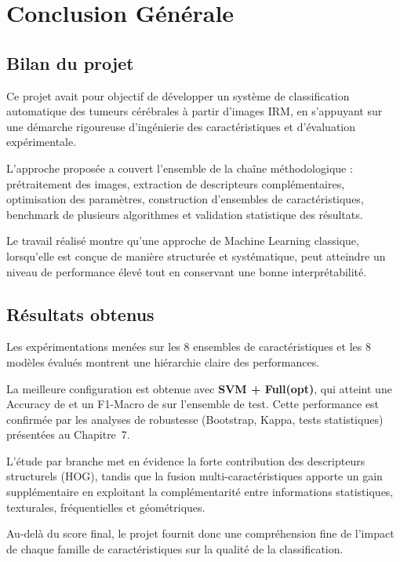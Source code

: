 \chapter*{Conclusion Générale}

\section*{Bilan du projet}
Ce projet avait pour objectif de développer un système de classification automatique des
tumeurs cérébrales à partir d'images IRM, en s'appuyant sur une démarche rigoureuse
d'ingénierie des caractéristiques et d'évaluation expérimentale.

L'approche proposée a couvert l'ensemble de la chaîne méthodologique : prétraitement des
images, extraction de descripteurs complémentaires, optimisation des paramètres, construction
d'ensembles de caractéristiques, benchmark de plusieurs algorithmes et validation statistique
des résultats.

Le travail réalisé montre qu'une approche de Machine Learning classique, lorsqu'elle est
conçue de manière structurée et systématique, peut atteindre un niveau de performance élevé
tout en conservant une bonne interprétabilité.

\section*{Résultats obtenus}
Les expérimentations menées sur les 8 ensembles de caractéristiques et les 8 modèles évalués
montrent une hiérarchie claire des performances.

La meilleure configuration est obtenue avec \textbf{SVM + Full(opt)}, qui atteint
une Accuracy de \bestAcc{} et un F1-Macro de \bestFone{} sur l'ensemble de test.
Cette performance est confirmée par les analyses de robustesse (Bootstrap, Kappa, tests
statistiques) présentées au Chapitre~7.

L'étude par branche met en évidence la forte contribution des descripteurs structurels (HOG),
tandis que la fusion multi-caractéristiques apporte un gain supplémentaire en exploitant la
complémentarité entre informations statistiques, texturales, fréquentielles et géométriques.

Au-delà du score final, le projet fournit donc une compréhension fine de l'impact de chaque
famille de caractéristiques sur la qualité de la classification.

